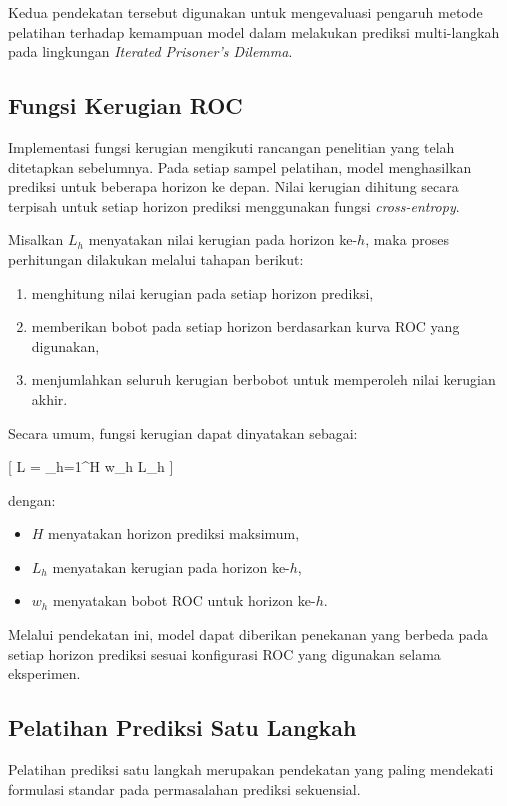 Kedua pendekatan tersebut digunakan untuk mengevaluasi pengaruh metode pelatihan terhadap kemampuan model dalam melakukan prediksi multi-langkah pada lingkungan \textit{Iterated Prisoner's Dilemma}.

\subsection{Fungsi Kerugian ROC}

Implementasi fungsi kerugian mengikuti rancangan penelitian yang telah ditetapkan sebelumnya. Pada setiap sampel pelatihan, model menghasilkan prediksi untuk beberapa horizon ke depan. Nilai kerugian dihitung secara terpisah untuk setiap horizon prediksi menggunakan fungsi \textit{cross-entropy}.

Misalkan $L_h$ menyatakan nilai kerugian pada horizon ke-$h$, maka proses perhitungan dilakukan melalui tahapan berikut:

\begin{enumerate}
\item menghitung nilai kerugian pada setiap horizon prediksi,
\item memberikan bobot pada setiap horizon berdasarkan kurva ROC yang digunakan,
\item menjumlahkan seluruh kerugian berbobot untuk memperoleh nilai kerugian akhir.
\end{enumerate}

Secara umum, fungsi kerugian dapat dinyatakan sebagai:

[
L = \sum_{h=1}^{H} w_h L_h
]

dengan:

\begin{itemize}
\item $H$ menyatakan horizon prediksi maksimum,
\item $L_h$ menyatakan kerugian pada horizon ke-$h$,
\item $w_h$ menyatakan bobot ROC untuk horizon ke-$h$.
\end{itemize}

Melalui pendekatan ini, model dapat diberikan penekanan yang berbeda pada setiap horizon prediksi sesuai konfigurasi ROC yang digunakan selama eksperimen.

\subsection{Pelatihan Prediksi Satu Langkah}

Pelatihan prediksi satu langkah merupakan pendekatan yang paling mendekati formulasi standar pada permasalahan prediksi sekuensial.

